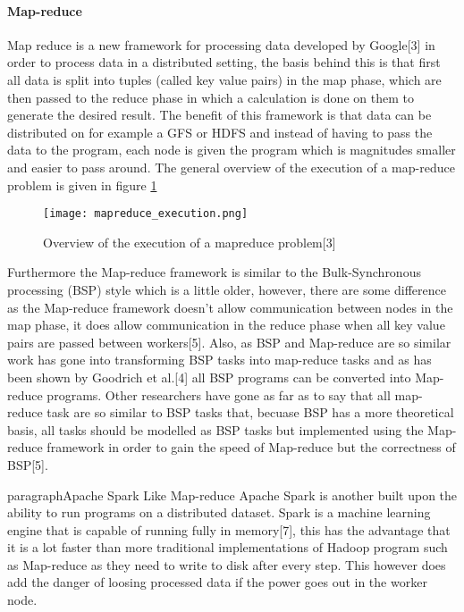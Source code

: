 \paragraph{Map-reduce}
Map reduce is a new framework for processing data developed by Google[3] in order
to process data in a distributed setting, the basis behind this is that first all
data is split into tuples (called key value pairs) in the map phase, which are then passed to the reduce
phase in which a calculation is done on them to generate the desired result. The
benefit of this framework is that data can be distributed on for example a GFS or HDFS
and instead of having to pass the data to the program, each node is given the program
which is magnitudes smaller and easier to pass around. The general overview of
the execution of a map-reduce problem is given in figure \ref{mapreduce_execution}

\begin{figure}
  \texttt{[image: mapreduce\_execution.png]}
  \caption{Overview of the execution of a mapreduce problem[3]}
  \label{mapreduce_execution}
\end{figure}

Furthermore the Map-reduce framework is similar to the Bulk-Synchronous processing (BSP)
style which is a little older, however, there are some difference as the Map-reduce
framework doesn't allow communication between nodes in the map phase, it does allow
communication in the reduce phase when all key value pairs are passed between workers[5].
Also, as BSP and Map-reduce are so similar work has gone into transforming BSP tasks into
map-reduce tasks and as has been shown by Goodrich et al.[4] all BSP programs can be
converted into Map-reduce programs. Other researchers have gone as far as to say
that all map-reduce task are so similar to BSP tasks that, becuase BSP has a more theoretical
basis, all tasks should be modelled as BSP tasks but implemented using the Map-reduce framework
in order to gain the speed of Map-reduce but the correctness of BSP[5].

paragraph{Apache Spark}
Like Map-reduce Apache Spark is another built upon the ability to run programs
on a distributed dataset. Spark is a machine learning engine that is capable of
running fully in memory[7], this has the advantage that it is a lot faster than
more traditional implementations of Hadoop program such as Map-reduce as they need
to write to disk after every step. This however does add the danger of loosing processed data
 if the power goes out in the worker node.


